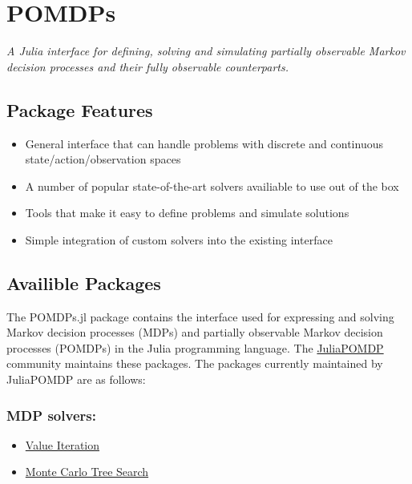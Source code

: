 \documentclass[12pt,]{article}
\date{}
\providecommand{\tightlist}{%
  \setlength{\itemsep}{0pt}\setlength{\parskip}{0pt}}
\begin{document}
{
\hypersetup{linkcolor=black}
\setcounter{tocdepth}{3}
\tableofcontents
}
\section{POMDPs}\label{pomdps}

\emph{A Julia interface for defining, solving and simulating partially
observable Markov decision processes and their fully observable
counterparts.}

\subsection{Package Features}\label{package-features}

\begin{itemize}
\tightlist
\item
  General interface that can handle problems with discrete and
  continuous state/action/observation spaces
\item
  A number of popular state-of-the-art solvers availiable to use out of
  the box
\item
  Tools that make it easy to define problems and simulate solutions
\item
  Simple integration of custom solvers into the existing interface
\end{itemize}

\subsection{Availible Packages}\label{availible-packages}

The POMDPs.jl package contains the interface used for expressing and
solving Markov decision processes (MDPs) and partially observable Markov
decision processes (POMDPs) in the Julia programming language. The
\href{https://github.com/JuliaPOMDP}{JuliaPOMDP} community maintains
these packages. The packages currently maintained by JuliaPOMDP are as
follows:

\subsubsection{MDP solvers:}\label{mdp-solvers}

\begin{itemize}
\tightlist
\item
  \href{https://github.com/JuliaPOMDP/DiscreteValueIteration.jl}{Value
  Iteration}
\item
  \href{https://github.com/JuliaPOMDP/MCTS.jl}{Monte Carlo Tree Search}
\end{itemize}
\end{document}
